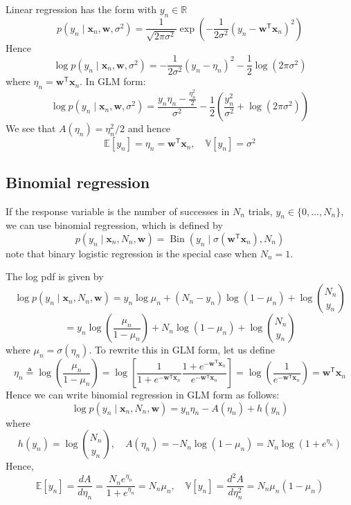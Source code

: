 \documentclass[11pt]{article}
\begin{document}
Linear regression has the form with $y_n \in \mathbb{R}$
\[
p(y_n \mid \boldsymbol{x}_n, \boldsymbol{w}, \sigma^2)
= \frac{1}{\sqrt{2\pi\sigma^2}}
\exp\left(-\frac{1}{2\sigma^2}(y_n - \boldsymbol{w}^{\mathsf{T}}\boldsymbol{x}_n)^2\right)
\]
Hence
\[
\log p(y_n \mid \boldsymbol{x}_n, \boldsymbol{w}, \sigma^2)
= -\frac{1}{2\sigma^2}(y_n - \eta_n)^2 - \frac{1}{2}\log(2\pi\sigma^2)
\]
where $\eta_n = \boldsymbol{w}^{\mathsf{T}}\boldsymbol{x}_n$. In GLM form:
\[
\log p(y_n \mid \boldsymbol{x}_n, \boldsymbol{w}, \sigma^2)
= \frac{y_n\eta_n - \frac{\eta_n^2}{2}}{\sigma^2}
- \frac{1}{2}\left(\frac{y_n^2}{\sigma^2} + \log(2\pi\sigma^2)\right)
\]
We see that $A(\eta_n) = \eta_n^2/2$ and hence
\[
\mathbb{E}[y_n] = \eta_n = \boldsymbol{w}^{\mathsf{T}}\boldsymbol{x}_n,\quad \mathbb{V}[y_n] = \sigma^2 
\]

\subsection{Binomial regression}

If the response variable is the number of successes in $N_n$ trials, $y_n \in \{0,\ldots,N_n\}$, we can use binomial regression, which is defined by
\[
p(y_n \mid \boldsymbol{x}_n, N_n, \boldsymbol{w})
= \operatorname{Bin}(y_n \mid \sigma(\boldsymbol{w}^{\mathsf{T}}\boldsymbol{x}_n), N_n)
\]
note that binary logistic regression is the special case when $N_n = 1$. 

The log pdf is given by
\[
\log p(y_n \mid \boldsymbol{x}_n, N_n, \boldsymbol{w})
= y_n\log \mu_n + (N_n-y_n)\log(1-\mu_n) + \log \binom{N_n}{y_n}
\]
\[
= y_n\log\left(\frac{\mu_n}{1-\mu_n}\right)
+ N_n\log(1-\mu_n) + \log \binom{N_n}{y_n}
\]
where $\mu_n = \sigma(\eta_n)$. To rewrite this in GLM form, let us define
\[
\eta_n \triangleq \log\left(\frac{\mu_n}{1-\mu_n}\right)
= \log\left[\frac{1}{1+e^{-\boldsymbol{w}^{\mathsf{T}}\boldsymbol{x}_n}}\frac{1+e^{-\boldsymbol{w}^{\mathsf{T}}\boldsymbol{x}_n}}{e^{-\boldsymbol{w}^{\mathsf{T}}\boldsymbol{x}_n}}\right]
= \log\left(\frac{1}{e^{-\boldsymbol{w}^{\mathsf{T}}\boldsymbol{x}_n}}\right)
= \boldsymbol{w}^{\mathsf{T}}\boldsymbol{x}_n
\]
Hence we can write binomial regression in GLM form as follows:
\[
\log p(y_n \mid \boldsymbol{x}_n, N_n, \boldsymbol{w})
= y_n\eta_n - A(\eta_n) + h(y_n)
\]
where
\[
h(y_n) = \log \binom{N_n}{y_n}, \quad
A(\eta_n) = -N_n\log(1-\mu_n) = N_n\log(1+e^{\eta_n})
\]
Hence,
\[
\mathbb{E}[y_n] = \frac{dA}{d\eta_n} = \frac{N_n e^{\eta_n}}{1+e^{\eta_n}} = N_n \mu_n, \quad \mathbb{V}[y_n] = \frac{d^2A}{d\eta_n^2} = N_n \mu_n (1-\mu_n)
\]
\end{document}
